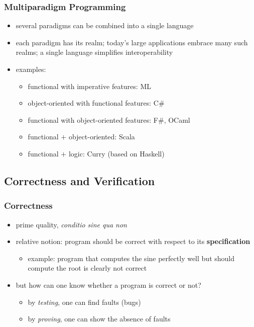 \begin{multicols}{2}
\subsubsection{Multiparadigm Programming}
\begin{itemize}
  \item several paradigms can be combined into a single language
  \item each paradigm has its realm; today's large applications embrace many such realms; a single language simplifies interoperability
  \item examples:
  \begin{itemize}
    \item functional with imperative features: ML
    \item object-oriented with functional features: C\#
    \item functional with object-oriented features: F\#, OCaml
    \item functional $+$ object-oriented: Scala
    \item functional $+$ logic: Curry (based on Haskell)
  \end{itemize}
\end{itemize}

\subsection{Correctness and Verification}
\subsubsection{Correctness}
\begin{itemize}
  \item prime quality, \textit{conditio sine qua non}
  \item relative notion: program should be correct with respect to its \textbf{specification}
  \begin{itemize}
    \item example: program that computes the sine perfectly well but should compute the root is clearly not correct
  \end{itemize}
  \item but how can one know whether a program is correct or not?
  \begin{itemize}
    \item by \textit{testing}, one can find faults (bugs)
    \item by \textit{proving}, one can show the absence of faults
  \end{itemize}
\end{itemize}


\end{multicols}
